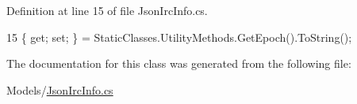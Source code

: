 Definition at line 15 of file Json\+Irc\+Info.\+cs.


\begin{DoxyCode}
15 \{ \textcolor{keyword}{get}; \textcolor{keyword}{set}; \} = StaticClasses.UtilityMethods.GetEpoch().ToString();
\end{DoxyCode}


The documentation for this class was generated from the following file\+:\begin{DoxyCompactItemize}
\item 
Models/\mbox{\hyperlink{_json_irc_info_8cs}{Json\+Irc\+Info.\+cs}}\end{DoxyCompactItemize}
